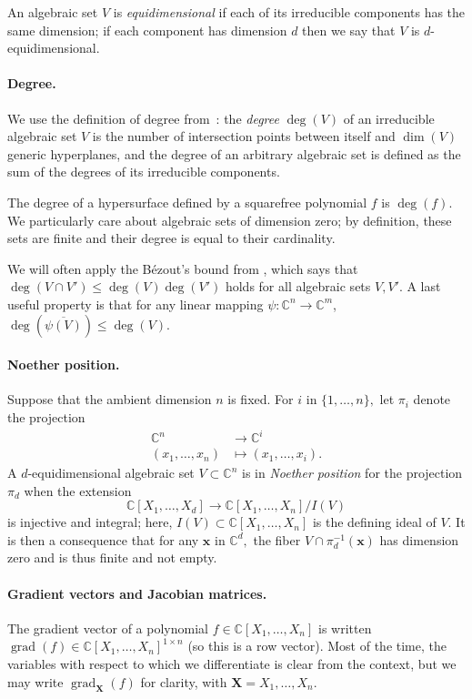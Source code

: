 \documentclass[12pt]{article}
\def\xb{{\bm x}}
\DeclareMathOperator{\grad}{grad}
\def\C{\mathbb{C}}
\begin{document}
An algebraic set $V$ is \textit{equidimensional} if each of its
irreducible components has the same dimension; if each component has
dimension $d$ then we say that $V$ is $d$-equidimensional.

\paragraph*{Degree.}
We use the definition of degree from~\cite{H}: the \textit{degree}
$\deg(V)$ of an irreducible algebraic set $V$ is the number of
intersection points between itself and $\dim (V)$ generic hyperplanes,
and the degree of an arbitrary algebraic set is defined as the sum of
the degrees of its irreducible components.

The degree of a hypersurface defined by a squarefree polynomial $f$ is
$\deg(f)$. We particularly care about algebraic sets of dimension zero; by
definition, these sets are finite and their degree is equal to their
cardinality.

We will often apply the B\'ezout’s bound from \cite[Theorem 1]{H},
which says that $\deg(V \cap V') \le \deg(V) \deg(V')$ holds for all
algebraic sets $V,V'$. A last useful property is that for any linear
mapping $\psi: \C^n \to \C^m$, $\deg(\overline{ \psi(V)}) \le \deg(V)$.

\paragraph*{Noether position.}
Suppose that the ambient dimension $n$ is fixed.  For $i$ in
$\{1,\dots,n\},$ let $\pi_i$ denote the projection
\begin{align*}
\C^n  &\rightarrow \C^i \\
(x_1,\hdots,x_n) &\mapsto  (x_1,\hdots,x_i).    
\end{align*} 
A $d$-equidimensional algebraic set $V \subset \C^n$ is in
\textit{Noether position} for the projection $\pi_d$ when the
extension \[\C[X_1,\hdots,X_{d}] \rightarrow \C[X_1,\hdots,X_n]/I(V)\]
is injective and integral; here, $I(V) \subset \C[X_1,\hdots,X_n]$ is
the defining ideal of $V$. It is then a consequence that for any $\xb$ in
$\C^d,$ the fiber $V \cap \pi_d^{-1}(\xb)$ has dimension zero and is
thus finite and not empty.

\paragraph*{Gradient vectors and Jacobian matrices.} The gradient vector 
of a polynomial $f \in \C[X_1,\dots,X_n]$ is written $\grad(f) \in
\C[X_1,\dots,X_n]^{1 \times n}$ (so this is a row vector). Most of the
time, the variables with respect to which we differentiate is clear
from the context, but we may write $\grad_{\bm X}(f)$ for clarity,
with $\bm X=X_1,\dots,X_n$.
\end{document}
